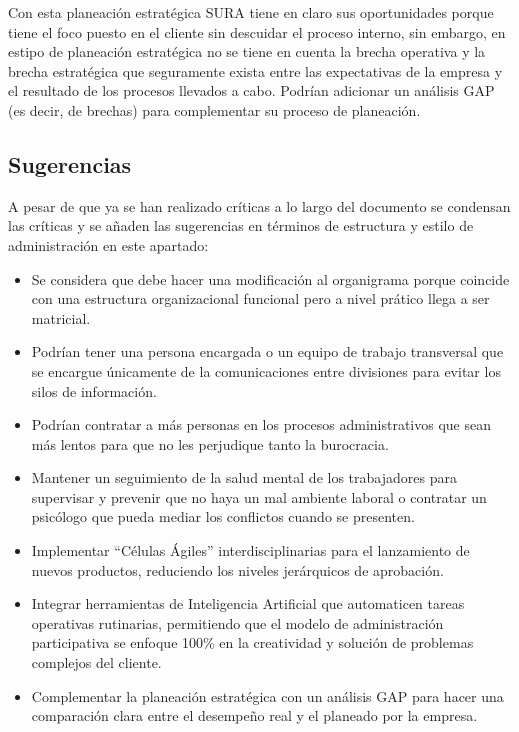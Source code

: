 \documentclass[onecolumn]{article} %
\begin{document}
	Con esta planeación estratégica SURA tiene en claro sus oportunidades porque tiene el foco puesto en el cliente sin descuidar el proceso interno, sin embargo, en estipo de planeación estratégica no se tiene en cuenta la brecha operativa y la brecha estratégica que seguramente exista entre las expectativas de la empresa y el resultado de los procesos llevados a cabo. Podrían adicionar un análisis GAP (es decir, de brechas) para complementar su proceso de planeación.
	
	\subsection{Sugerencias}
	
	A pesar de que ya se han realizado críticas a lo largo del documento se condensan las críticas y se añaden las sugerencias en términos de estructura y estilo de administración  en este apartado: 
	
	\begin{itemize}
		\item Se considera que debe hacer una modificación al organigrama porque coincide con una estructura organizacional funcional pero a nivel prático llega a ser matricial.
		\item Podrían tener una persona encargada o un equipo de trabajo transversal que se encargue únicamente de la comunicaciones entre divisiones para evitar los silos de información.
		\item Podrían contratar a más personas en los procesos administrativos que sean más lentos para que no les perjudique tanto la burocracia.
		\item Mantener un seguimiento de la salud mental de los trabajadores para supervisar y prevenir que no haya un mal ambiente laboral o contratar un psicólogo que pueda mediar los conflictos cuando se presenten.
		\item Implementar ``Células Ágiles'' interdisciplinarias para el lanzamiento de nuevos productos, reduciendo los niveles jerárquicos de aprobación.
		\item Integrar herramientas de Inteligencia Artificial que automaticen tareas operativas rutinarias, permitiendo que el modelo de administración participativa se enfoque 100\% en la creatividad y solución de problemas complejos del cliente.
		\item Complementar la planeación estratégica con un análisis GAP para hacer una comparación clara entre el desempeño real y el planeado por la empresa.
		
	\end{itemize}
	
\end{document}
